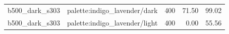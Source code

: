 \begin{longtable}{l>{\raggedright\arraybackslash}p{.42\linewidth}rrr}
b500\_\allowbreak{}dark\_\allowbreak{}s303 & %
palette:indigo\_\allowbreak{}lavender/dark & %
400 & %
71.50 & %
99.02 \\ %

b500\_\allowbreak{}dark\_\allowbreak{}s303 & %
palette:indigo\_\allowbreak{}lavender/light & %
400 & %
0.00 & %
55.56 \\ %


\end{longtable}
